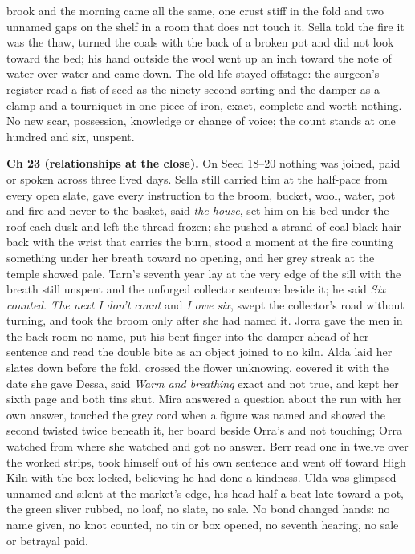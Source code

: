 \documentclass{design/chronicle}
\begin{document}
{brook and the morning came all the same, one crust stiff in the fold and two unnamed gaps on the shelf in a room that does not touch it. Sella told the fire it was the thaw, turned the coals with the back of a broken pot and did not look toward the bed; his hand outside the wool went up an inch toward the note of water over water and came down. The old life stayed offstage: the surgeon’s register read a fist of seed as the ninety-second sorting and the damper as a clamp and a tourniquet in one piece of iron, exact, complete and worth nothing. No new scar, possession, knowledge or change of voice; the count stands at one hundred and six, unspent.

\textbf{Ch 23 (relationships at the close).} On Seed 18–20 nothing was joined, paid or spoken across three lived days. Sella still carried him at the half-pace from every open slate, gave every instruction to the broom, bucket, wool, water, pot and fire and never to the basket, said \emph{the house}, set him on his bed under the roof each dusk and left the thread frozen; she pushed a strand of coal-black hair back with the wrist that carries the burn, stood a moment at the fire counting something under her breath toward no opening, and her grey streak at the temple showed pale. Tarn’s seventh year lay at the very edge of the sill with the breath still unspent and the unforged collector sentence beside it; he said \emph{Six counted. The next I don’t count} and \emph{I owe six}, swept the collector’s road without turning, and took the broom only after she had named it. Jorra gave the men in the back room no name, put his bent finger into the damper ahead of her sentence and read the double bite as an object joined to no kiln. Alda laid her slates down before the fold, crossed the flower unknowing, covered it with the date she gave Dessa, said \emph{Warm and breathing} exact and not true, and kept her sixth page and both tins shut. Mira answered a question about the run with her own answer, touched the grey cord when a figure was named and showed the second twisted twice beneath it, her board beside Orra’s and not touching; Orra watched from where she watched and got no answer. Berr read one in twelve over the worked strips, took himself out of his own sentence and went off toward High Kiln with the box locked, believing he had done a kindness. Ulda was glimpsed unnamed and silent at the market’s edge, his head half a beat late toward a pot, the green sliver rubbed, no loaf, no slate, no sale. No bond changed hands: no name given, no knot counted, no tin or box opened, no seventh hearing, no sale or betrayal paid.

}
\end{document}
